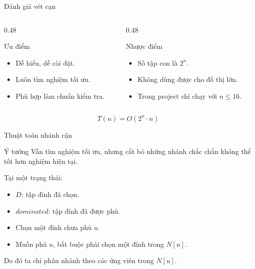 \documentclass[aspectratio=169, 11pt]{beamer}
\begin{document}
\begin{frame}{Đánh giá vét cạn}
  \begin{columns}
    \begin{column}{0.48\textwidth}
      \begin{block}{Ưu điểm}
        \begin{itemize}
          \item Dễ hiểu, dễ cài đặt.
          \item Luôn tìm nghiệm tối ưu.
          \item Phù hợp làm chuẩn kiểm tra.
        \end{itemize}
      \end{block}
    \end{column}
    \begin{column}{0.48\textwidth}
      \begin{block}{Nhược điểm}
        \begin{itemize}
          \item Số tập con là $2^n$.
          \item Không dùng được cho đồ thị lớn.
          \item Trong project chỉ chạy với $n\leq16$.
        \end{itemize}
      \end{block}
    \end{column}
  \end{columns}

  \vspace{0.4cm}
  \[
    T(n)=O(2^n\cdot n)
  \]
\end{frame}

\begin{frame}{Thuật toán nhánh cận}
  \begin{block}{Ý tưởng}
    Vẫn tìm nghiệm tối ưu, nhưng cắt bỏ những nhánh chắc chắn không thể tốt hơn nghiệm hiện tại.
  \end{block}

  Tại một trạng thái:
  \begin{itemize}
    \item $D$: tập đỉnh đã chọn.
    \item $dominated$: tập đỉnh đã được phủ.
    \item Chọn một đỉnh chưa phủ $u$.
    \item Muốn phủ $u$, bắt buộc phải chọn một đỉnh trong $N[u]$.
  \end{itemize}

  Do đó ta chỉ phân nhánh theo các ứng viên trong $N[u]$.
\end{frame}
\end{document}
